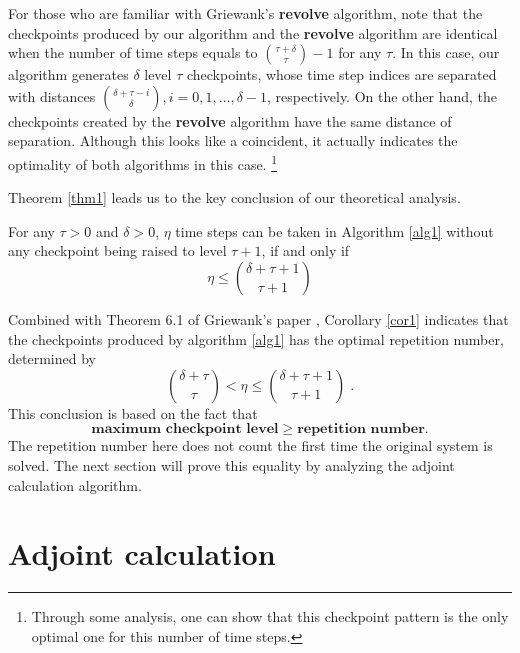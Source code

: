 For those who are familiar with Griewank's {\bf revolve} algorithm, note that
the checkpoints produced by our algorithm and the {\bf revolve} algorithm are
identical when the number of time steps equals to
$\binom{\tau + \delta}{\tau} - 1$ for any $\tau$.  In this case, our algorithm
generates $\delta$ level $\tau$ checkpoints, whose time step indices are
separated with distances
$\binom{\delta + \tau - i}{\delta}, i = 0, 1, \ldots, \delta - 1$,
respectively.  On the other hand, the checkpoints created by the {\bf revolve}
algorithm have the same distance of separation.  Although this looks like a
coincident, it actually indicates the optimality of both algorithms in this
case.
\footnote{Through some analysis, one can show that this checkpoint pattern
is the only optimal one for this number of time steps.}

Theorem \ref{thm1} leads us to the key conclusion of our theoretical analysis.

\begin{corollary} \label{cor1}
    For any $\tau > 0$ and $\delta > 0$, $\eta$ time steps can be taken in
    Algorithm \ref{alg1} without any checkpoint being raised to level $\tau+1$,
    if and only if \[ \eta \le \binom{\delta + \tau+1}{\tau+1} \]
\end{corollary}

Combined with Theorem 6.1 of Griewank's paper \cite[]{griewank92},
Corollary \ref{cor1} indicates that the checkpoints produced by algorithm
\ref{alg1} has the optimal repetition number, determined by
\[ \binom{\delta + \tau}{\tau} < \eta \le \binom{\delta + \tau+1}{\tau+1} \;.\]
This conclusion is based on the fact that
\begin{equation} \label{eqn1}
\textbf{maximum checkpoint level} \ge \textbf{repetition number} .
\end{equation}
The repetition number here does not count the first time the
original system is solved.  The next section will prove this equality by
analyzing the adjoint calculation algorithm.





\section{Adjoint calculation \label{sec_adj}}

